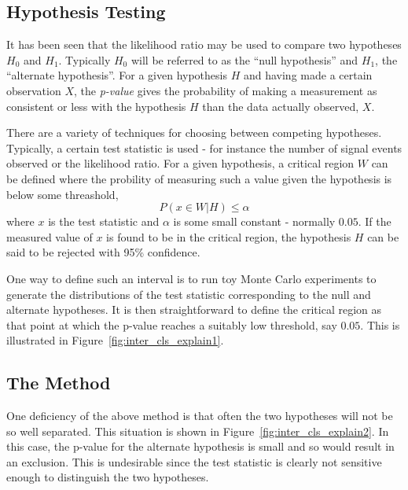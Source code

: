 \subsection{Hypothesis Testing}
\label{sec:inter_cls}
It has been seen that the likelihood ratio may be used to compare two hypotheses
$H_0$ and $H_1$. Typically $H_0$ will be referred to as the ``null hypothesis''
and $H_1$, the ``alternate hypothesis''. For a given hypothesis $H$ and having
made a certain observation $X$, the \emph{p-value} gives the probability of
making a measurement as consistent or less with the hypothesis $H$ than the data
actually observed, $X$.

There are a variety of techniques for choosing between competing
hypotheses. Typically, a certain test statistic is used - for instance the
number of signal events observed or the likelihood ratio. For a given
hypothesis, a critical region $W$ can be defined where the probility of measuring
such a value given the hypothesis is below some threashold,
\begin{equation*}
P\left(x \in W|H\right) \leq \alpha
\end{equation*}
where $x$ is the test statistic and $\alpha$ is some small constant - normally
$0.05$. If the measured value of $x$ is found to be in the critical region, the
hypothesis $H$ can be said to be rejected with 95\% confidence.

One way to define such an interval is to run toy Monte Carlo experiments to
generate the distributions of the test statistic corresponding to the null and
alternate hypotheses. It is then straightforward to define the critical region
as that point at which the p-value reaches a suitably low threshold, say
$0.05$. This is illustrated in Figure~\ref{fig:inter_cls_explain1}.

\begin{figure}
\centering
{}
\caption[]{}
\label{fig:inter_cls_explain}
\end{figure}

\subsection{The \CLs Method}
One deficiency of the above method is that often the two hypotheses will not be
so well separated. This situation is shown in
Figure~\ref{fig:inter_cls_explain2}. In this case, the p-value for the alternate
hypothesis is small and so would result in an exclusion. This is undesirable
since the test statistic is clearly not sensitive enough to distinguish the two
hypotheses.

